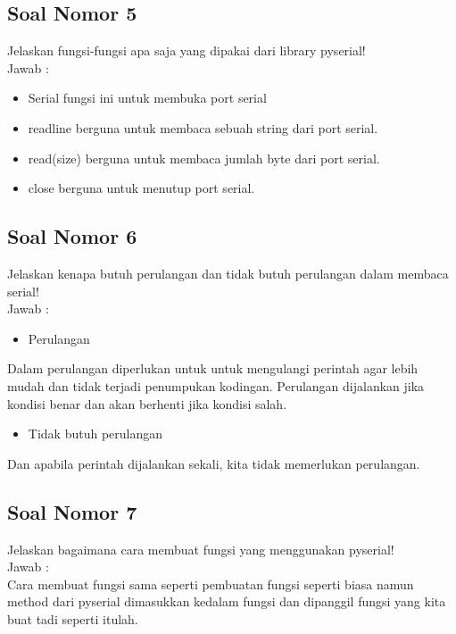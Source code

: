 \subsection{Soal Nomor 5}
Jelaskan fungsi-fungsi apa saja yang dipakai dari library pyserial!\\
Jawab :\\
\begin{itemize}
\item Serial fungsi ini untuk membuka port serial
\item readline berguna untuk membaca sebuah string dari port serial.
\item read(size) berguna untuk membaca jumlah byte dari port serial.
\item close berguna untuk menutup port serial.
\end{itemize}

\subsection{Soal Nomor 6}
Jelaskan kenapa butuh perulangan dan tidak butuh perulangan dalam membaca serial!\\
Jawab :\\
\begin{itemize}
\item Perulangan
\end{itemize}
Dalam perulangan diperlukan untuk untuk mengulangi perintah agar lebih mudah dan tidak terjadi penumpukan kodingan. Perulangan dijalankan jika kondisi benar dan akan berhenti jika kondisi salah.

\begin{itemize}
\item Tidak butuh perulangan
\end{itemize}
Dan apabila perintah dijalankan sekali, kita tidak memerlukan perulangan.

\subsection{Soal Nomor 7}
Jelaskan bagaimana cara membuat fungsi yang menggunakan pyserial!\\
Jawab :\\
Cara membuat fungsi sama seperti pembuatan fungsi seperti biasa namun method dari pyserial dimasukkan kedalam fungsi dan dipanggil fungsi yang kita buat tadi seperti itulah.

